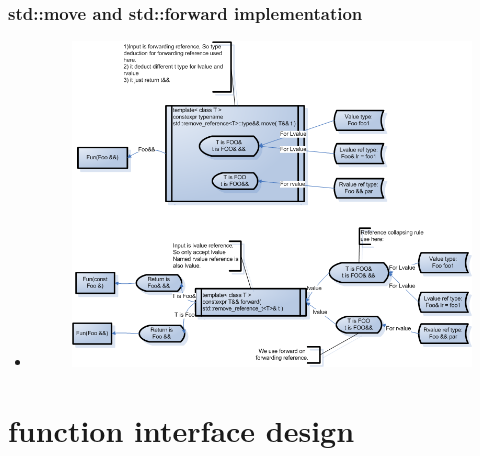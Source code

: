 \documentclass[a4paper,12pt,twoside]{book}
\begin{document}
\subsubsection{std::move and std::forward implementation}
\begin{itemize}
	\item 
	\begin{figure}
		\centering
		\includegraphics[width=0.7\linewidth]{pics/rvalue_ref}
		\caption{}
		\label{fig:rvalueref}
	\end{figure}
	
\end{itemize}


\section{function interface design}
\end{document}

